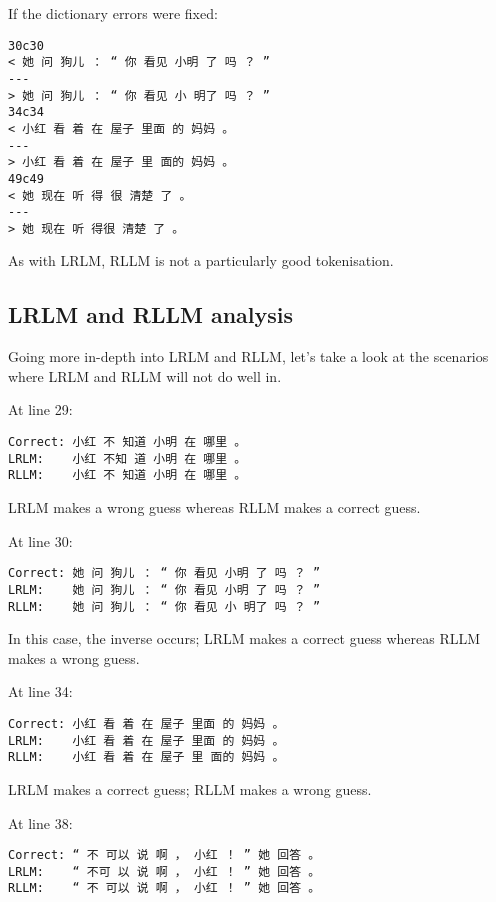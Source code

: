 \documentclass{article}
\begin{document}
If the dictionary errors were fixed:

\begin{verbatim}
30c30
< 她 问 狗儿 ： “ 你 看见 小明 了 吗 ？ ”
---
> 她 问 狗儿 ： “ 你 看见 小 明了 吗 ？ ”
34c34
< 小红 看 着 在 屋子 里面 的 妈妈 。
---
> 小红 看 着 在 屋子 里 面的 妈妈 。
49c49
< 她 现在 听 得 很 清楚 了 。
---
> 她 现在 听 得很 清楚 了 。
\end{verbatim}

As with LRLM, RLLM is not a particularly good tokenisation.

\subsection{LRLM and RLLM analysis}

Going more in-depth into LRLM and RLLM, let's take a look at the
scenarios where LRLM and RLLM will not do well in.

At line 29:

\begin{verbatim}
Correct: 小红 不 知道 小明 在 哪里 。
LRLM:    小红 不知 道 小明 在 哪里 。
RLLM:    小红 不 知道 小明 在 哪里 。
\end{verbatim}

LRLM makes a wrong guess whereas RLLM makes a correct guess.

At line 30:

\begin{verbatim}
Correct: 她 问 狗儿 ： “ 你 看见 小明 了 吗 ？ ”
LRLM:    她 问 狗儿 ： “ 你 看见 小明 了 吗 ？ ”
RLLM:    她 问 狗儿 ： “ 你 看见 小 明了 吗 ？ ”
\end{verbatim}

In this case, the inverse occurs; LRLM makes a correct guess whereas
RLLM makes a wrong guess.

At line 34:

\begin{verbatim}
Correct: 小红 看 着 在 屋子 里面 的 妈妈 。
LRLM:    小红 看 着 在 屋子 里面 的 妈妈 。
RLLM:    小红 看 着 在 屋子 里 面的 妈妈 。
\end{verbatim}

LRLM makes a correct guess; RLLM makes a wrong guess.

At line 38:

\begin{verbatim}
Correct: “ 不 可以 说 啊 ， 小红 ！ ” 她 回答 。
LRLM:    “ 不可 以 说 啊 ， 小红 ！ ” 她 回答 。
RLLM:    “ 不 可以 说 啊 ， 小红 ！ ” 她 回答 。
\end{verbatim}
\end{document}
